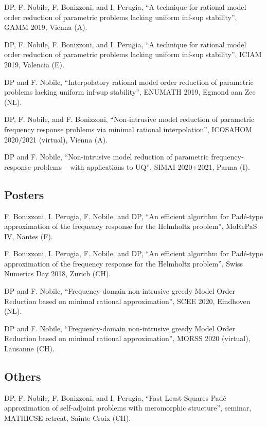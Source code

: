 \documentclass[11pt]{article} %
\begin{document}
\hspace{\parindent}DP, F. Nobile, F. Bonizzoni, and I. Perugia, ``A technique for rational model order reduction of parametric problems lacking uniform inf-sup stability'', GAMM 2019, Vienna (A).

DP, F. Nobile, F. Bonizzoni, and I. Perugia, ``A technique for rational model order reduction of parametric problems lacking uniform inf-sup stability'', ICIAM 2019, Valencia (E).

\yearsminus DP and F. Nobile, ``Interpolatory rational model order reduction of parametric problems lacking uniform inf-sup stability'', \mbox{ENUMATH} 2019, Egmond aan Zee (NL).

DP, F. Nobile, and F. Bonizzoni, ``Non-intrusive model reduction of parametric frequency response problems via minimal rational interpolation'', \mbox{ICOSAHOM} 2020/2021 (virtual), Vienna (A).

DP and F. Nobile, ``Non-intrusive model reduction of parametric frequency-response problems -- with applications to UQ'', SIMAI 2020+2021, Parma (I).

\subsection*{Posters}

\hspace{\parindent}F. Bonizzoni, I. Perugia, F. Nobile, and DP, ``An efficient algorithm for Pad\'e-type approximation of the frequency response for the Helmholtz problem'', \mbox{MoRePaS} IV, Nantes (F).

\yearsminus F. Bonizzoni, I. Perugia, F. Nobile, and DP, ``An efficient algorithm for Pad\'e-type approximation of the frequency response for the Helmholtz problem'', Swiss Numerics Day 2018, Zurich (CH).

DP and F. Nobile, ``Frequency-domain non-intrusive greedy Model Order Reduction based on minimal rational approximation'', SCEE 2020, Eindhoven (NL).

\yearsminus DP and F. Nobile, ``Frequency-domain non-intrusive greedy Model Order Reduction based on minimal rational approximation'', MORSS 2020 (virtual), Lausanne (CH).

\subsection*{Others}

\hspace{\parindent}DP, F. Nobile, F. Bonizzoni, and I. Perugia, ``Fast Least-Squares Pad\'e approximation of self-adjoint problems with meromorphic structure'', seminar, \mbox{MATHICSE} retreat, Sainte-Croix (CH).
\end{document}
